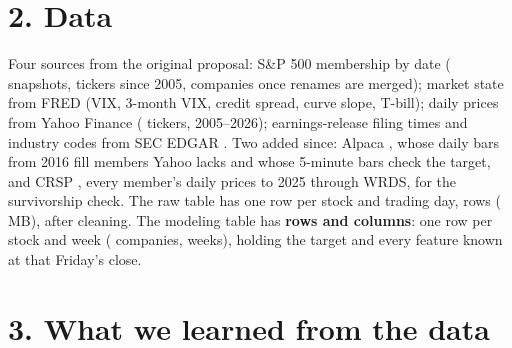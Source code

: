 \documentclass[11pt]{article}
\begin{document}
\section*{2. Data}

Four sources from the original proposal: S\&P 500 membership by date \citep{aultman2026sp500}
(\nSnapshots{} snapshots, \nOldTickers{} tickers since 2005, \nUniverse{} companies once renames are
merged); market state from FRED \citep{fred2026} (VIX, 3-month VIX, credit spread, curve slope,
T-bill); daily prices from Yahoo Finance \citep{aroussi2026yfinance} (\nYahoo{} tickers, 2005--2026);
earnings-release filing times and industry codes from SEC EDGAR \citep{sec2026edgar}. Two added since:
Alpaca \citep{alpaca2026data}, whose daily bars from 2016 fill \nAlpaca{} members Yahoo lacks and whose
5-minute bars check the target, and CRSP \citep{crsp2026}, every member's daily prices to 2025 through
WRDS, for the survivorship check. The raw table has one row per stock and trading day, \nRawRows{} rows
(\dataMB{} MB), \nCleanRows{} after cleaning. The modeling table has \textbf{\nTableRows{} rows and
\nTableCols{} columns}: one row per stock and week (\nCompanies{} companies, \nWeeks{} weeks), holding
the target and every feature known at that Friday's close.

\section*{3. What we learned from the data}
\end{document}
